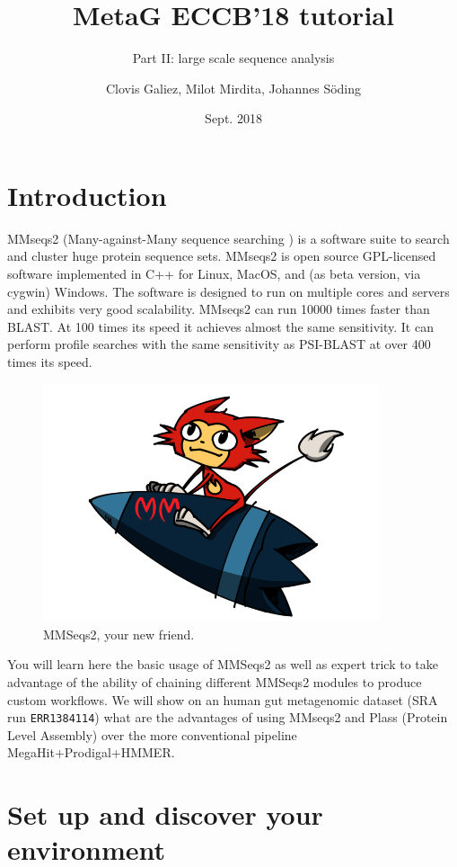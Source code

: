 \documentclass{scrartcl}
\title{MetaG ECCB'18 tutorial}
\subtitle{Part II: large scale sequence analysis}
\author{Clovis Galiez, Milot Mirdita, Johannes Söding}
\date{Sept. 2018}
\begin{document}
\maketitle

\section{Introduction}
MMseqs2 (Many-against-Many sequence searching \citep{steinegger2017mmseqs2}) is a software suite to search and cluster huge protein sequence sets. MMseqs2 is open source GPL-licensed software implemented in C++ for Linux, MacOS, and (as beta version, via cygwin) Windows. The software is designed to run on multiple cores and servers and exhibits very good scalability. MMseqs2 can run 10000 times faster than BLAST. At 100 times its speed it achieves almost the same sensitivity. It can perform profile searches with the same sensitivity as PSI-BLAST at over 400 times its speed.

\begin{figure}[h!]
\centering
\includegraphics[height=70mm]{mmseqs2_logo.png}
\caption{MMSeqs2, your new friend.}
\label{fig:universe}
\end{figure}

You will learn here the basic usage of MMSeqs2 as well as expert trick to take advantage of the ability of chaining different MMSeqs2 modules to produce custom workflows. We will show on an human gut metagenomic dataset (SRA run \texttt{ERR1384114}) what are the advantages of using MMseqs2 and Plass (Protein Level Assembly) over the more conventional pipeline MegaHit\citep{li2015megahit}+Prodigal\citep{hyatt2010prodigal}+HMMER\citep{eddy2009new}.



\section{Set up and discover your environment}
\end{document}
